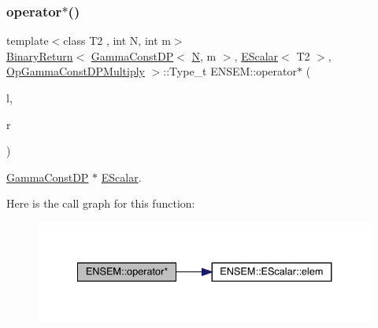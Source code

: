 \subsubsection{\texorpdfstring{operator$\ast$()}{operator*()}\hspace{0.1cm}{\footnotesize\ttfamily [6/9]}}
{\footnotesize\ttfamily template$<$class T2 , int N, int m$>$ \\
\mbox{\hyperlink{structENSEM_1_1BinaryReturn}{Binary\+Return}}$<$ \mbox{\hyperlink{classENSEM_1_1GammaConstDP}{Gamma\+Const\+DP}}$<$ \mbox{\hyperlink{adat__devel_2lib_2hadron_2operator__name__util_8cc_a7722c8ecbb62d99aee7ce68b1752f337}{N}}, m $>$, \mbox{\hyperlink{classENSEM_1_1EScalar}{E\+Scalar}}$<$ T2 $>$, \mbox{\hyperlink{structENSEM_1_1OpGammaConstDPMultiply}{Op\+Gamma\+Const\+D\+P\+Multiply}} $>$\+::Type\+\_\+t E\+N\+S\+E\+M\+::operator$\ast$ (\begin{DoxyParamCaption}\item[{const \mbox{\hyperlink{classENSEM_1_1GammaConstDP}{Gamma\+Const\+DP}}$<$ \mbox{\hyperlink{adat__devel_2lib_2hadron_2operator__name__util_8cc_a7722c8ecbb62d99aee7ce68b1752f337}{N}}, m $>$ \&}]{l,  }\item[{const \mbox{\hyperlink{classENSEM_1_1EScalar}{E\+Scalar}}$<$ T2 $>$ \&}]{r }\end{DoxyParamCaption})\hspace{0.3cm}{\ttfamily [inline]}}



\mbox{\hyperlink{classENSEM_1_1GammaConstDP}{Gamma\+Const\+DP}} $\ast$ \mbox{\hyperlink{classENSEM_1_1EScalar}{E\+Scalar}}. 

Here is the call graph for this function\+:
\nopagebreak
\begin{figure}[H]
\begin{center}
\leavevmode
\includegraphics[width=334pt]{d4/dca/group__escalar_ga37b9d878f5157952ec965d47a1032bc0_cgraph}
\end{center}
\end{figure}
\mbox{\label{group__escalar_gaa60096d471282c83dab865d42b53ce96}} 

